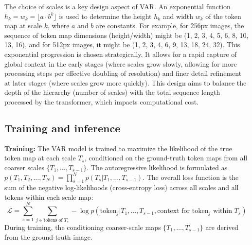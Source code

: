 \documentclass{article}
\begin{document}
The choice of scales is a key design aspect of VAR. An exponential function $h_k=w_k=\lfloor a \cdot b^k \rfloor$ is used to determine the height $h_k$ and width $w_k$ of the token map at scale $k$, where $a$ and $b$ are constants. For example, for 256px images, the sequence of token map dimensions (height/width) might be (1, 2, 3, 4, 5, 6, 8, 10, 13, 16), and for 512px images, it might be (1, 2, 3, 4, 6, 9, 13, 18, 24, 32). This exponential progression is chosen strategically. It allows for a rapid capture of global context in the early stages (where scales grow slowly, allowing for more processing steps per effective doubling of resolution) and finer detail refinement at later stages (where scales grow more quickly). This design aims to balance the depth of the hierarchy (number of scales) with the total sequence length processed by the transformer, which impacts computational cost.

\subsection{Training and inference}
\label{ssec:training_inference}

\textbf{Training:} The VAR model is trained to maximize the likelihood of the true token map at each scale $T_s$, conditioned on the ground-truth token maps from all coarser scales $\{T_1, \ldots, T_{s-1}\}$. The autoregressive likelihood is formulated as $p(T_1, T_2, \ldots, T_N) = \prod_{s=1}^{N} p(T_s | T_1, \ldots, T_{s-1})$. The overall loss function is the sum of the negative log-likelihoods (cross-entropy loss) across all scales and all tokens within each scale map:
\begin{equation}
\mathcal{L} = \sum_{s=1}^{N} \sum_{j \in \text{tokens of } T_s} -\log p(\text{token}_j | T_1, \ldots, T_{s-1}, \text{context for token}_j \text{ within } T_s)
\label{eq:loss}
\end{equation}
During training, the conditioning coarser-scale maps $\{T_1, \ldots, T_{s-1}\}$ are derived from the ground-truth image.
\end{document}
